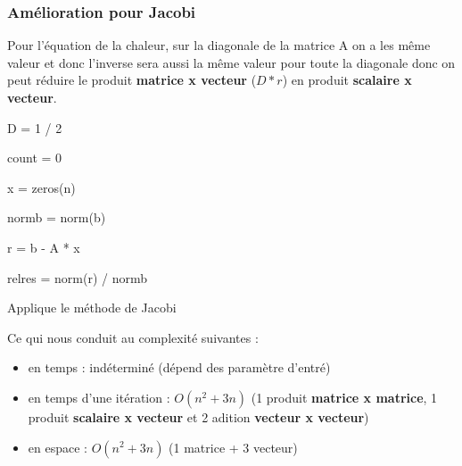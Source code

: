 \documentclass[11pt]{article}
\begin{document}
\subsubsection{Amélioration pour Jacobi}

Pour l'équation de la chaleur, sur la diagonale de la matrice A on a
les même valeur et donc l'inverse sera aussi la même valeur pour toute
la diagonale donc on peut réduire le produit \textbf{matrice x
  vecteur} ($D * r$) en produit \textbf{scalaire x vecteur}.\newline
\vspace{5mm}
\begin{algorithm} [H]
  \SetAlgoLined

  D = 1 / 2 

  count = 0 

  x = zeros(n) 

  normb = norm(b) 

  r = b - A * x 

  relres = norm(r) / normb 


  \caption{Applique le méthode de Jacobi}
\end{algorithm}
\vspace{5mm}
Ce qui nous conduit au complexité suivantes :

\begin{itemize}
\item en temps : indéterminé (dépend des paramètre d'entré)
\item en temps d'une itération : $O(n^2 + 3n)$ (1 produit \textbf{matrice x
  matrice}, 1 produit \textbf{scalaire x vecteur} et 2 adition
  \textbf{vecteur x vecteur})
\item en espace : $O(n^2 + 3n)$ (1 matrice + 3 vecteur)
\end{itemize}
\end{document}
